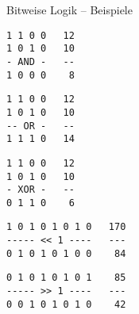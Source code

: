 
\begin{frame}[fragile]{Bitweise Logik -- Beispiele}
%
%
\begin{center}
%
\begin{codebox}[AND]
\begin{verbatim}
1 1 0 0   12
1 0 1 0   10
- AND -   --
1 0 0 0    8
\end{verbatim}
\end{codebox}
%
\hspace{1em}
%
\begin{codebox}[OR]
\begin{verbatim}
1 1 0 0   12
1 0 1 0   10
-- OR -   --
1 1 1 0   14
\end{verbatim}
\end{codebox}
%
\hspace{1em}
%
\begin{codebox}[XOR]
\begin{verbatim}
1 1 0 0   12
1 0 1 0   10
- XOR -   --
0 1 1 0    6
\end{verbatim}
\end{codebox}
%
\end{center}
%
%
%
\begin{center}
%
\begin{codebox}
\begin{verbatim}
1 0 1 0 1 0 1 0   170
----- << 1 ----   ---
0 1 0 1 0 1 0 0    84
\end{verbatim}
\end{codebox}
%
\hspace{\fill}
%
\begin{codebox}
\begin{verbatim}
0 1 0 1 0 1 0 1    85
----- >> 1 ----   ---
0 0 1 0 1 0 1 0    42
\end{verbatim}
\end{codebox}
%
\end{center}
%
\end{frame}


